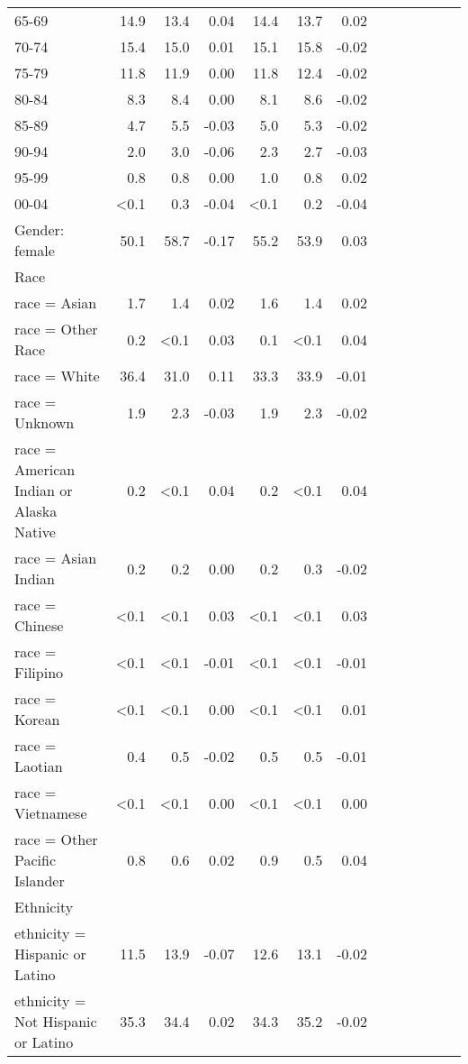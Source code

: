 \documentclass[11pt,]{article}
\begin{document}
\begin{longtable}{lrrrrrrrrrrrr}
      65-69 & 14.9 & 13.4 &  0.04 & 14.4 & 13.7 &  0.02 \\ 
      70-74 & 15.4 & 15.0 &  0.01 & 15.1 & 15.8 & -0.02 \\ 
      75-79 & 11.8 & 11.9 &  0.00 & 11.8 & 12.4 & -0.02 \\ 
      80-84 &  8.3 &  8.4 &  0.00 &  8.1 &  8.6 & -0.02 \\ 
      85-89 &  4.7 &  5.5 & -0.03 &  5.0 &  5.3 & -0.02 \\ 
      90-94 &  2.0 &  3.0 & -0.06 &  2.3 &  2.7 & -0.03 \\ 
      95-99 &  0.8 &  0.8 &  0.00 &  1.0 &  0.8 &  0.02 \\ 
      00-04 & <0.1 &  0.3 & -0.04 & <0.1 &  0.2 & -0.04 \\ 
  Gender: female & 50.1 & 58.7 & -0.17 & 55.2 & 53.9 &  0.03 \\ 
  Race &    &    &     &    &    &     \\ 
      race = Asian &  1.7 &  1.4 &  0.02 &  1.6 &  1.4 &  0.02 \\ 
      race = Other Race &  0.2 & <0.1 &  0.03 &  0.1 & <0.1 &  0.04 \\ 
      race = White & 36.4 & 31.0 &  0.11 & 33.3 & 33.9 & -0.01 \\ 
      race = Unknown &  1.9 &  2.3 & -0.03 &  1.9 &  2.3 & -0.02 \\ 
      race = American Indian or Alaska Native &  0.2 & <0.1 &  0.04 &  0.2 & <0.1 &  0.04 \\ 
      race = Asian Indian &  0.2 &  0.2 &  0.00 &  0.2 &  0.3 & -0.02 \\ 
      race = Chinese & <0.1 & <0.1 &  0.03 & <0.1 & <0.1 &  0.03 \\ 
      race = Filipino & <0.1 & <0.1 & -0.01 & <0.1 & <0.1 & -0.01 \\ 
      race = Korean & <0.1 & <0.1 &  0.00 & <0.1 & <0.1 &  0.01 \\ 
      race = Laotian &  0.4 &  0.5 & -0.02 &  0.5 &  0.5 & -0.01 \\ 
      race = Vietnamese & <0.1 & <0.1 &  0.00 & <0.1 & <0.1 &  0.00 \\ 
      race = Other Pacific Islander &  0.8 &  0.6 &  0.02 &  0.9 &  0.5 &  0.04 \\ 
  Ethnicity &    &    &     &    &    &     \\ 
      ethnicity = Hispanic or Latino & 11.5 & 13.9 & -0.07 & 12.6 & 13.1 & -0.02 \\ 
      ethnicity = Not Hispanic or Latino & 35.3 & 34.4 &  0.02 & 34.3 & 35.2 & -0.02 \\ 

\end{longtable}
\end{document}

